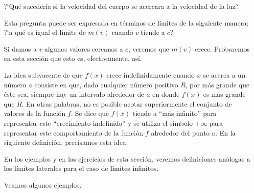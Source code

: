 ?`Qué sucedería si la velocidad del cuerpo se acercara a la velocidad de la luz?

Esta pregunta puede ser expresada en términos de límites de la siguiente manera: ?`a qué es igual el
límite de $m(v)$ cuando $v$ tiende a $c$?

Si damos a $v$ algunos valores cercanos a $c$, veremos que $m(v)$ crece. Probaremos en esta sección
que esto es, efectivamente, así.

La idea subyacente de que $f(x)$ crece indefinidamente cuando $x$ se acerca a un número $a$
consiste en que, dado cualquier número positivo $R$, por más grande que éste sea, siempre hay un
intervalo alrededor de $a$ en donde $f(x)$ es más grande que $R$. En otras palabras, no es posible
acotar superiormente el conjunto de valores de la función $f$. Se dice que $f(x)$ tiende a ``más
infinito'' para representar este ``crecimiento indefinido'' y se utiliza el símbolo $+\infty$ para
representar este comportamiento de la función $f$ alrededor del punto $a$. En la siguiente
definición, precisamos esta idea.


En los ejemplos y en los ejercicios de esta sección, veremos definiciones análogas a los límites
laterales para el caso de límites infinitos.

Veamos algunos ejemplos.

